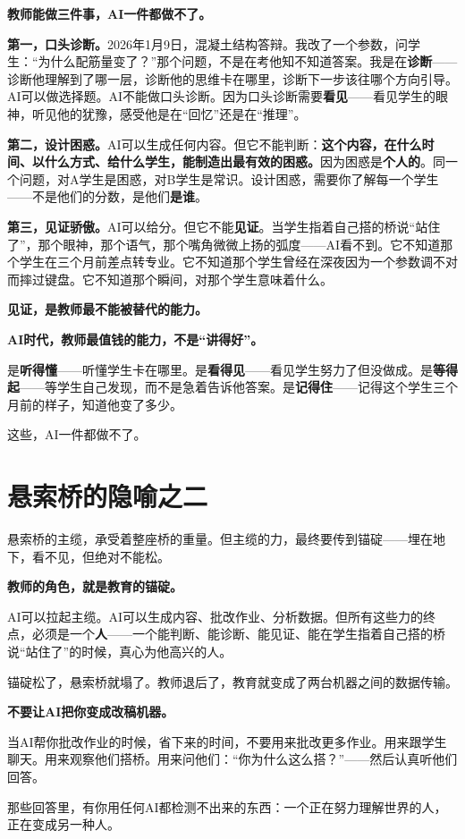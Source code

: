 \textbf{教师能做三件事，AI一件都做不了。}

\textbf{第一，口头诊断。}2026年1月9日，混凝土结构答辩。我改了一个参数，问学生：``为什么配筋量变了？''那个问题，不是在考他知不知道答案。我是在\textbf{诊断}——诊断他理解到了哪一层，诊断他的思维卡在哪里，诊断下一步该往哪个方向引导。AI可以做选择题。AI不能做口头诊断。因为口头诊断需要\textbf{看见}——看见学生的眼神，听见他的犹豫，感受他是在``回忆''还是在``推理''。

\textbf{第二，设计困惑。}AI可以生成任何内容。但它不能判断：\textbf{这个内容，在什么时间、以什么方式、给什么学生，能制造出最有效的困惑。}因为困惑是\textbf{个人的}。同一个问题，对A学生是困惑，对B学生是常识。设计困惑，需要你了解每一个学生——不是他们的分数，是他们\textbf{是谁}。

\textbf{第三，见证骄傲。}AI可以给分。但它不能\textbf{见证}。当学生指着自己搭的桥说``站住了''，那个眼神，那个语气，那个嘴角微微上扬的弧度——AI看不到。它不知道那个学生在三个月前差点转专业。它不知道那个学生曾经在深夜因为一个参数调不对而摔过键盘。它不知道那个瞬间，对那个学生意味着什么。

\textbf{见证，是教师最不能被替代的能力。}

\begin{insight}
\label{insight:chap11}

\textbf{AI时代，教师最值钱的能力，不是``讲得好''。}

是\textbf{听得懂}——听懂学生卡在哪里。是\textbf{看得见}——看见学生努力了但没做成。是\textbf{等得起}——等学生自己发现，而不是急着告诉他答案。是\textbf{记得住}——记得这个学生三个月前的样子，知道他变了多少。

这些，AI一件都做不了。
\end{insight}

\section{悬索桥的隐喻之二}

悬索桥的主缆，承受着整座桥的重量。但主缆的力，最终要传到锚碇——埋在地下，看不见，但绝对不能松。

\textbf{教师的角色，就是教育的锚碇。}

AI可以拉起主缆。AI可以生成内容、批改作业、分析数据。但所有这些力的终点，必须是一个\textbf{人}——一个能判断、能诊断、能见证、能在学生指着自己搭的桥说``站住了''的时候，真心为他高兴的人。

锚碇松了，悬索桥就塌了。教师退后了，教育就变成了两台机器之间的数据传输。

\begin{shiyu-note}
\label{note:chap11}

\textbf{不要让AI把你变成改稿机器。}

当AI帮你批改作业的时候，省下来的时间，不要用来批改更多作业。用来跟学生聊天。用来观察他们搭桥。用来问他们：``你为什么这么搭？''——然后认真听他们回答。

那些回答里，有你用任何AI都检测不出来的东西：一个正在努力理解世界的人，正在变成另一种人。
\end{shiyu-note}

